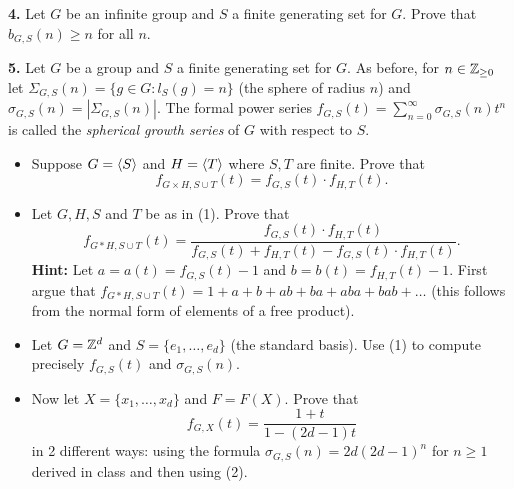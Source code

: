 \documentclass[12pt]{amsart}
\begin{document}
{\bf 4.} Let $G$ be an infinite group and $S$ a finite generating set for $G$. Prove that $b_{G,S}(n)\geq n$ for all $n$. 

\skv
{\bf 5.} Let $G$ be a group and $S$ a finite generating set for $G$. As before, for $n\in{\mathbb Z}_{\geq 0}$
let $\Sigma_{G,S}(n)=\{g\in G: l_{S}(g)= n\}$ (the sphere of radius $n$) and $\sigma_{G,S}(n)=|\Sigma_{G,S}(n)|$. 
The formal power series $f_{G,S}(t)=\sum\limits_{n=0}^{\infty} \sigma_{G,S}(n) t^n$ is called the {\it spherical growth series}
of $G$ with respect to $S$.
\begin{itemize}
\item[(1)] Suppose $G={\langle} S{\rangle}$ and $H={\langle} T{\rangle}$ where $S,T$ are finite. Prove that
$$f_{G\times H,S\cup T}(t)=f_{G,S}(t)\cdot f_{H,T}(t).$$
\item[(2)] Let $G,H,S$ and $T$ be as in (1). Prove that
$$f_{G* H,S\cup T}(t)=\frac{f_{G,S}(t)\cdot f_{H,T}(t)}{f_{G,S}(t)+f_{H,T}(t)-f_{G,S}(t)\cdot f_{H,T}(t)}.$$
{\bf Hint:} Let $a=a(t)=f_{G,S}(t)-1$ and $b=b(t)=f_{H,T}(t)-1$. First argue that
$f_{G* H,S\cup T}(t)=1+a+b+ab+ba+aba+bab+\ldots$ (this follows from the normal form of elements of a free product).

\item[(3)] Let $G={\mathbb Z}^d$ and $S=\{e_1,\ldots,e_d\}$ (the standard basis). Use (1) to compute precisely
$f_{G,S}(t)$ and $\sigma_{G,S}(n)$.

\item[(4)] Now let $X=\{x_1,\ldots, x_d\}$ and $F=F(X)$. Prove that $$f_{G,X}(t)=\frac{1+t}{1-(2d-1)t}$$
in 2 different ways: using the formula $\sigma_{G,S}(n)=2d(2d-1)^n$ for $n\geq 1$ derived in class and then using (2).
\end{itemize}
\end{document}
